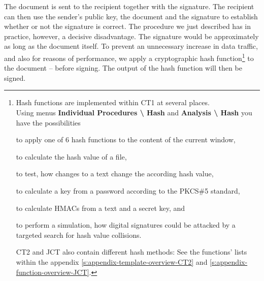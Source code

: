 \begin{bibunit}[babalpha]
The document is sent to the recipient together with the signature. The recipient
can then use the sender's public key, the document and the signature to
establish whether or not the signature is correct. The procedure we just described
has in practice, however, a decisive disadvantage. The signature would be
approximately as long as the document itself. To prevent an unnecessary increase
in data traffic, and also for reasons of performance, we apply
a cryptographic hash function\footnote{%
Hash functions are implemented within 
CT1 at several places.\\
Using menus {\bf Individual Procedures \textbackslash{} Hash} and
            {\bf Analysis \textbackslash{} Hash}
you have the possibilities
\begin{list}{\textbullet}{\addtolength{\itemsep}{-1.0\baselineskip}}
\item to apply one of 6 hash functions to the content of the current window,\\
\item to calculate the hash value of a file,\\
\item to test, how changes to a text change the according hash value,\\
\item to calculate a key from a password according to the PKCS\#5 
      standard,\\
\item to calculate HMACs from a text and a secret key, and\\
\item to perform a simulation, how digital signatures could be attacked 
      by a targeted search for hash value collisions.
\end{list}
CT2 and JCT also contain different hash
methods: See the functions' lists within the appendix
\ref{s:appendix-template-overview-CT2} and
\ref{s:appendix-function-overview-JCT}.}
to the document -- before signing. The output of the hash function will 
then be signed.



\hypertarget{Hash-functions-ht}{}

\end{bibunit}
